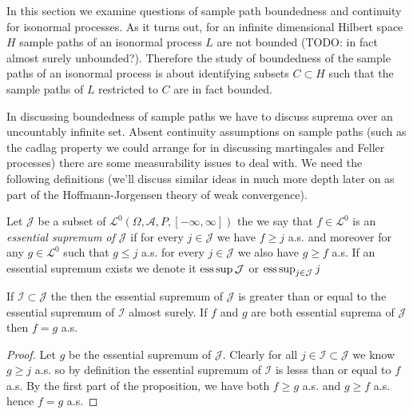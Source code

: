 In this section we examine questions of sample path boundedness and continuity for isonormal processes.  As it turns out, for an infinite dimensional Hilbert space $H$ sample paths of an isonormal process $L$ are not bounded (TODO: in fact almost surely unbounded?).  Therefore the study of boundedness of the sample paths of an isonormal process is about identifying subsets $C \subset H$ such that the sample paths of $L$ restricted to $C$ are in fact bounded.  

In discussing boundedness of sample paths we have to discuss suprema over an uncountably infinite set.  Absent continuity assumptions on sample paths (such as the cadlag property we could arrange for in discussing martingales and Feller processes) there are some measurability issues to deal with.  We need the following definitions (we'll discuss similar ideas in much more depth later on as part of the Hoffmann-Jorgensen theory of weak convergence).

\begin{defn}Let $\mathcal{J}$ be a subset of $\mathcal{L}^0(\Omega, \mathcal{A}, P, [-\infty, \infty])$ the we say that $f \in \mathcal{L}^0$ is an \emph{essential supremum of $\mathcal{J}$} if 
for every $j \in \mathcal{J}$ we have $f \geq j$ a.s. and moreover for any $g \in \mathcal{L}^0$ such that $g \leq j$ a.s. for every $j \in \mathcal{J}$ we also have $g \geq f$ a.s.  If an essential supremum exists we denote it $\operatorname*{ess\,sup} \mathcal{J}$ or $\operatorname*{ess\,sup}_{j \in \mathcal{J}} j$
\end{defn}

\begin{prop}\label{AlmostSureUniquenessEssentialSupremum}If $\mathcal{I} \subset \mathcal{J}$ the then the essential supremum of $\mathcal{J}$ is greater than or equal to the essential supremum of $\mathcal{I}$ almost surely.  If $f$ and $g$ are both essential suprema of $\mathcal{J}$ then $f = g$ a.s.
\end{prop}
\begin{proof}
Let $g$ be the essential supremum of $\mathcal{J}$.  Clearly for all $j \in \mathcal{I} \subset \mathcal{J}$ we know $g \geq j$ a.s.  so by definition the essential supremum of $\mathcal{I}$ is lesss than or equal to $f$ a.s.  By the first part of the proposition, we have both $f \geq g$ a.s. and $g \geq f$ a.s. hence $f=g$ a.s.
\end{proof}


